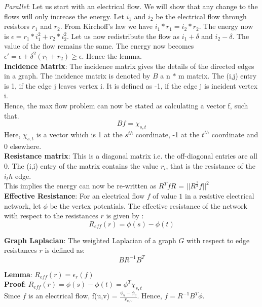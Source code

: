 \documentclass[a4paper,10pt]{article}
\newcommand{\eps}{\epsilon}
\begin{document}
	\textit{Parallel}:  Let us start with an electrical flow. We will show that any change to the flows will only increase the energy.
	Let $i_1$ and $i_2$ be the electrical flow through resistors $r_1$ and $r_2$. From Kirchoff's law we have $i_1 \ast r_1 = i_2 \ast r_2 $.
	The energy now is $\eps = r_1  \ast i_1^2 + r_2 \ast i_2^2$. Let us now redistribute the flow as $i_1 + \delta$ and $i_2 - \delta$. 
	The value of the flow remains the same. The energy now becomes $\eps' = \eps + \delta^2(r_1+r_2) \geq \eps$. Hence the lemma. \\
	
	\textbf{Incidence Matrix}: The incidence matrix gives the details of the directed edges in a graph. The incidence matrix is denoted
	by $B$ a n $\ast$ m matrix. The (i,j) entry is 1, if the edge j leaves vertex i. It is defined as -1, if the edge j is incident 
	vertex i. \\
	
	Hence, the max flow problem can now be stated as calculating a vector f, such that.
	$$Bf = \chi_{s,t}$$
	Here, $\chi_{s,t}$ is a vector which is 1 at the $s^{th}$ coordinate, -1 at the $t^{th}$ coordinate and 0 elsewhere. \\
	
	\textbf{Resistance matrix}:
	   This is a diagonal matrix i.e. the off-diagonal entries are all 0. The (i,i) entry of the matrix contains the value $r_i$, that is
	   the resistance of the $i_th$ edge. \\
	   
	   This implies the energy can now be re-written as $R^TfR$ = $||R^{\frac{1}{2}}f||^2$ \\
	   
	\textbf{Effective Resistance}: For an electrical flow $f$ of value $1$ in a resistive electrical network, let $\phi$ be the vertex potentials.
	The effective resistance of the network with respect to the resistances $r$ is given by : 
	$$R_{eff}(r) = \phi(s) - \phi(t)$$
	
	\textbf{Graph Laplacian}: The weighted Laplacian of a graph $G$ with respect to edge resistances $r$ is defined as:
	$$BR^{-1}B^T$$
	
	\textbf{Lemma}: $R_{eff}(r) = \eps_r(f)$ \\
	    
	\textbf{Proof}: $R_{eff}(r) = \phi(s) - \phi(t) = \phi^T \chi_{s,t}$ \\
	
	Since $f$ is an electrical flow, f(u,v) = $\frac{\phi_u - \phi_v}{r_{u,v}}$. Hence, $f = R^{-1}B^T \phi$.\\
	
\end{document}
